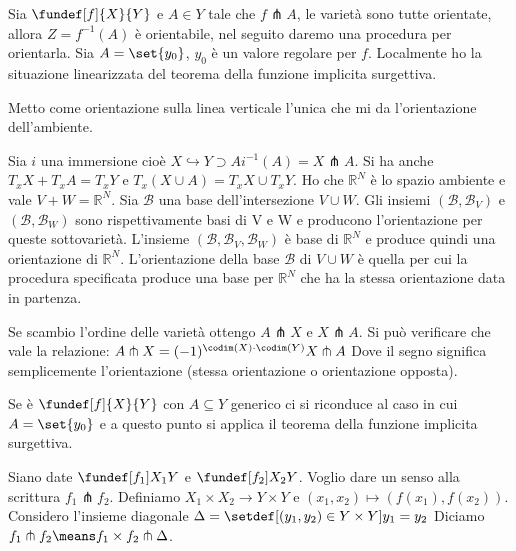 

Sia $\fundef[f]{X}{Y}$ e $A \in Y$ tale che $f \pitchfork A$, le varietà sono tutte orientate, allora $Z = f^{-1}(A)$ è orientabile, nel seguito daremo una procedura per orientarla.
Sia $A = \set{y_0}$, $y_0$ è un valore regolare per $f$. Localmente ho la situazione linearizzata del teorema della funzione implicita surgettiva.


Metto come orientazione sulla linea verticale l'unica che mi da l'orientazione dell'ambiente.

Sia $i$ una immersione cioè $X \hookrightarrow Y \supset A i^{-1} (A) = X \pitchfork A$. Si ha anche $T_{x}X + T_{x}A = T_{x}Y$ e $T_{x}(X \cup A) = T_{x}X \cup T_{x}Y$. Ho che $\mathbb{R}^{N}$
\newcommand*\base{\mathcal B}
è lo spazio ambiente e vale $V+W = \mathbb{R}^{N}$. Sia $\base$ una base dell'intersezione $V \cup W $. Gli insiemi $(\base, \base_{V})$ e  $(\base, \base_{W})$ sono rispettivamente basi di V e W
e producono l'orientazione per queste sottovarietà. L'insieme $(\base, \base_V, \base_W)$ è base di $\mathbb{R}^{N}$ e produce quindi una orientazione di $\mathbb{R}^{N}$.
L'orientazione della base $\base$ di $V \cup W$ è quella per cui la procedura specificata produce una base per $\mathbb{R}^{N}$ che ha la stessa orientazione data in partenza.

\begin{oss}
 Se scambio l'ordine delle varietà ottengo $A \pitchfork X$ e $X \pitchfork A$. Si può verificare che vale la relazione: $ A \pitchfork X = (-1)^{\codim(X) \cdot \codim(Y)} X \pitchfork A$
 Dove il segno significa semplicemente l'orientazione (stessa orientazione o orientazione opposta).
\end{oss}

Se è $\fundef[f]{X}{Y}$ con $A \subseteq Y$ generico ci si riconduce al caso in cui $A = \set{y_{0}}$ e a questo punto si applica il teorema della funzione implicita surgettiva.


\begin{defn}
Siano date $\fundef[f_{1}]{X_{1}}{Y}$ e $\fundef[f_{2}]{X_{2}}{Y}$. Voglio dare un senso alla scrittura $f_{1} \pitchfork f_{2}$.
Definiamo $X_{1} \times X_{2} \rightarrow Y \times Y$ e $(x_{1}, x_{2}) \mapsto (f(x_{1}), f(x_{2}))$. Considero l'insieme diagonale $\Delta = \setdef[(y_{1}, y_{2}) \in Y \times Y]{y_{1} = y_{2}}$
Diciamo $f_{1} \pitchfork f_{2} \means f_{1} \times f_{2} \pitchfork \Delta$.
\end{defn}

